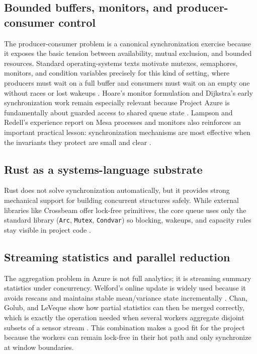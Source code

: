 \documentclass[11pt]{article}
\begin{document}
\subsection*{Bounded buffers, monitors, and producer-consumer control}
The producer-consumer problem is a canonical synchronization exercise because it exposes the basic tension between availability, mutual exclusion, and bounded resources. Standard operating-systems texts motivate mutexes, semaphores, monitors, and condition variables precisely for this kind of setting, where producers must wait on a full buffer and consumers must wait on an empty one without races or lost wakeups \cite{silberschatz2018,tanenbaum2014,andrews2000}. Hoare's monitor formulation and Dijkstra's early synchronization work remain especially relevant because Project Azure is fundamentally about guarded access to shared queue state \cite{hoare1974,dijkstra1968}. Lampson and Redell's experience report on Mesa processes and monitors also reinforces an important practical lesson: synchronization mechanisms are most effective when the invariants they protect are small and clear \cite{lampson1980}.

\subsection*{Rust as a systems-language substrate}
Rust does not solve synchronization automatically, but it provides strong mechanical support for building concurrent structures safely. While external libraries like Crossbeam \cite{crossbeam2026} offer lock-free primitives, the core queue uses only the standard library (\texttt{Arc}, \texttt{Mutex}, \texttt{Condvar}) \cite{ruststd2026} so blocking, wakeups, and capacity rules stay visible in project code \cite{rustbook2019,bos2023}.

\subsection*{Streaming statistics and parallel reduction}
The aggregation problem in Azure is not full analytics; it is streaming summary statistics under concurrency. Welford's online update is widely used because it avoids rescans and maintains stable mean/variance state incrementally \cite{welford1962}. Chan, Golub, and LeVeque show how partial statistics can then be merged correctly, which is exactly the operation needed when several workers aggregate disjoint subsets of a sensor stream \cite{chan1979}. This combination makes a good fit for the project because the workers can remain lock-free in their hot path and only synchronize at window boundaries.
\end{document}

